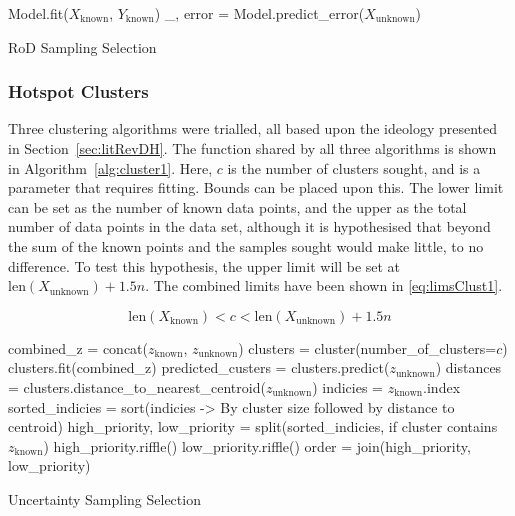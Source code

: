 \begin{algorithm}[H]
  Model.fit($X_\mathrm{known}$, $Y_\mathrm{known}$)\;
  \_, error = Model.predict\_error($X_\mathrm{unknown}$)\;
  \caption{RoD Sampling Selection}
  \label{alg:rod}\SetAlgoLined
\end{algorithm}

\subsubsection{Hotspot Clusters}
Three clustering algorithms were trialled, all based upon the ideology presented in Section~\ref{sec:litRevDH}. The function shared by all three algorithms is shown in Algorithm~\ref{alg:cluster1}. Here, $c$ is the number of clusters sought, and is a parameter that requires fitting. Bounds can be placed upon this. The lower limit can be set as the number of known data points, and the upper as the total number of data points in the data set, although it is hypothesised that beyond the sum of the known points and the samples sought would make little, to no difference. To test this hypothesis, the upper limit will be set at $\mathrm{len}(X_\mathrm{unknown})+1.5n$. The combined limits have been shown in \ref{eq:limsClust1}.

\begin{equation}
  \label{eq:limsClust1}
  {\mathrm{len}(X_\mathrm{known})<c<\mathrm{len}(X_\mathrm{unknown})+1.5n}
\end{equation}

\begin{algorithm}[H]
  combined\_z = concat($z_\mathrm{known}$, $z_\mathrm{unknown}$)\;
  clusters = cluster(number\_of\_clusters=$c$)\;
  clusters.fit(combined\_z)\;
  predicted\_custers = clusters.predict($z_\mathrm{unknown}$)\;
  distances = clusters.distance\_to\_nearest\_centroid($z_\mathrm{unknown}$)\;
  indicies = $z_\mathrm{known}$.index\;
  sorted\_indicies = sort(indicies -> By cluster size followed by distance to centroid) \;
  high\_priority, low\_priority = split(sorted\_indicies, if cluster contains $z_\mathrm{known}$)\;
  high\_priority.riffle()\;
  low\_priority.riffle()\;
  order = join(high\_priority, low\_priority)\;

  \caption{Uncertainty Sampling Selection}
  \label{alg:cluster1}\SetAlgoLined
\end{algorithm}


